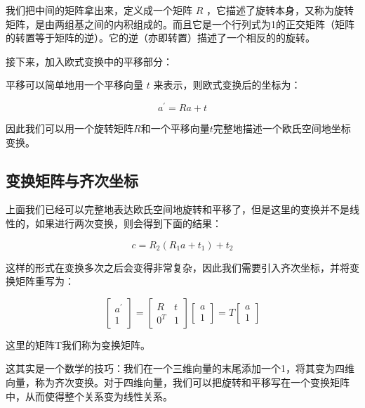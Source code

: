 \documentclass[9pt, oneside]{book}
\begin{document}
我们把中间的矩阵拿出来，定义成一个矩阵 $R$ ，它描述了旋转本身，又称为旋转矩阵，是由两组基之间的内积组成的。而且它是一个行列式为1的正交矩阵（矩阵的转置等于矩阵的逆）。它的逆（亦即转置）描述了一个相反的的旋转。

接下来，加入欧式变换中的平移部分：

平移可以简单地用一个平移向量 $t$ 来表示，则欧式变换后的坐标为：

\begin{equation}
    a^\prime = Ra + t
\end{equation}

因此我们可以用一个旋转矩阵$R$和一个平移向量$t$完整地描述一个欧氏空间地坐标变换。

\subsection{变换矩阵与齐次坐标}

上面我们已经可以完整地表达欧氏空间地旋转和平移了，但是这里的变换并不是线性的，如果进行两次变换，则会得到下面的结果：

\begin{equation}
    c = R_2(R_1a+t_1)+t_2
\end{equation}

这样的形式在变换多次之后会变得非常复杂，因此我们需要引入齐次坐标，并将变换矩阵重写为：

\begin{equation}
    \begin{bmatrix}
        a^\prime \\
        1
       \end{bmatrix}
       =
       \begin{bmatrix}
        R & t\\
        0^T & 1
       \end{bmatrix}
       \begin{bmatrix}
        a\\
        1
       \end{bmatrix}
       =
       T
       \begin{bmatrix}
        a\\
        1
       \end{bmatrix}
\end{equation}

这里的矩阵T我们称为变换矩阵。

这其实是一个数学的技巧：我们在一个三维向量的末尾添加一个1，将其变为四维向量，称为齐次变换。对于四维向量，我们可以把旋转和平移写在一个变换矩阵中，从而使得整个关系变为线性关系。
\end{document}

